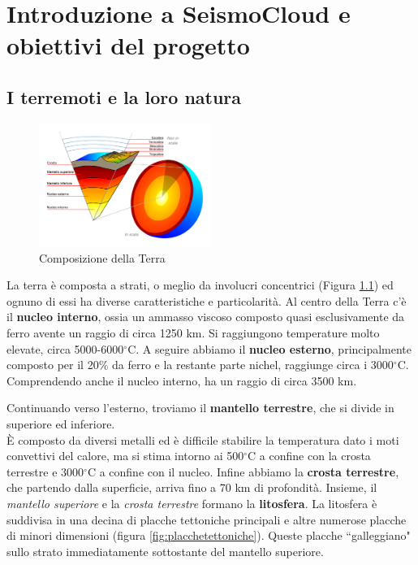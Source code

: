 \documentclass[a4paper,10pt]{memoir}
\begin{document}
\tableofcontents
\cleardoublepage

\mainmatter

\renewcommand\chapterheadstart{}
\renewcommand\printchaptername{}
\renewcommand\chapternamenum{}
\renewcommand\printchapternum{}
\renewcommand\afterchapternum{}
\renewcommand\printchaptertitle[1]{\chaptitlefont \thechapter. \space #1}


\chapter{Introduzione a SeismoCloud e obiettivi del progetto}

\section{I terremoti e la loro natura}

\begin{figure}
\caption{Composizione della Terra}
\label{fig:crostaterrestre}
\includegraphics[width=0.50\textwidth]{Chapter-1/crosta-terrestre.png}
\end{figure}

La terra è composta a strati, o meglio da involucri concentrici (Figura \ref{fig:crostaterrestre}) ed ognuno di essi ha diverse caratteristiche e particolarità.
Al centro della Terra c'è il \textbf{nucleo interno}, ossia un ammasso viscoso composto quasi esclusivamente da ferro avente un raggio di circa 1250 km. Si raggiungono temperature molto elevate, circa 5000-6000$^{\circ}$C.
A seguire abbiamo il \textbf{nucleo esterno}, principalmente composto per il 20\% da ferro e la restante parte nichel, raggiunge circa i 3000$^{\circ}$C. Comprendendo anche il nucleo interno, ha un raggio di circa 3500 km.

Continuando verso l'esterno, troviamo il \textbf{mantello terrestre}, che si divide in superiore ed inferiore.
\\
È composto da diversi metalli ed è difficile stabilire la temperatura dato i moti convettivi del calore, ma si stima intorno ai 500$^{\circ}$C a confine con la crosta terrestre e 3000$^{\circ}$C a confine con il nucleo.
Infine abbiamo la \textbf{crosta terrestre}, che partendo dalla superficie, arriva fino a 70 km di profondità.
Insieme, il \textit{mantello superiore} e la \textit{crosta terrestre} formano la \textbf{litosfera}.
La litosfera è suddivisa in una decina di placche tettoniche principali e altre numerose placche di minori dimensioni (figura \ref{fig:placchetettoniche}). Queste placche ``galleggiano" sullo strato immediatamente sottostante del mantello superiore.\cite{terra}
\end{document}
